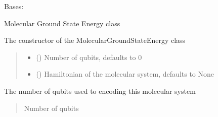 \documentclass[letterpaper,10pt,english]{sphinxmanual}
\begin{document}
\begin{fulllineitems}
\label{\detokenize{qcompute_qapp.application.chemistry:qcompute_qapp.application.chemistry.MolecularGroundStateEnergy}}
\pysigstartsignatures
{}
\pysigstopsignatures
\sphinxAtStartPar
Bases: 

\sphinxAtStartPar
Molecular Ground State Energy class

\sphinxAtStartPar
The constructor of the MolecularGroundStateEnergy class
\begin{quote}\begin{description}
\begin{itemize}
\item {} 
\sphinxAtStartPar
{} () \textendash{} Number of qubits, defaults to 0

\item {} 
\sphinxAtStartPar
{} () \textendash{} Hamiltonian of the molecular system, defaults to None

\end{itemize}

\end{description}\end{quote}

\begin{fulllineitems}
\label{\detokenize{qcompute_qapp.application.chemistry:qcompute_qapp.application.chemistry.MolecularGroundStateEnergy.num_qubits}}
\pysigstartsignatures
{}
\pysigstopsignatures
\sphinxAtStartPar
The number of qubits used to encoding this molecular system
\begin{quote}\begin{description}
\sphinxAtStartPar
Number of qubits


\end{description}
\end{quote}
\end{fulllineitems}
\end{fulllineitems}
\end{document}
